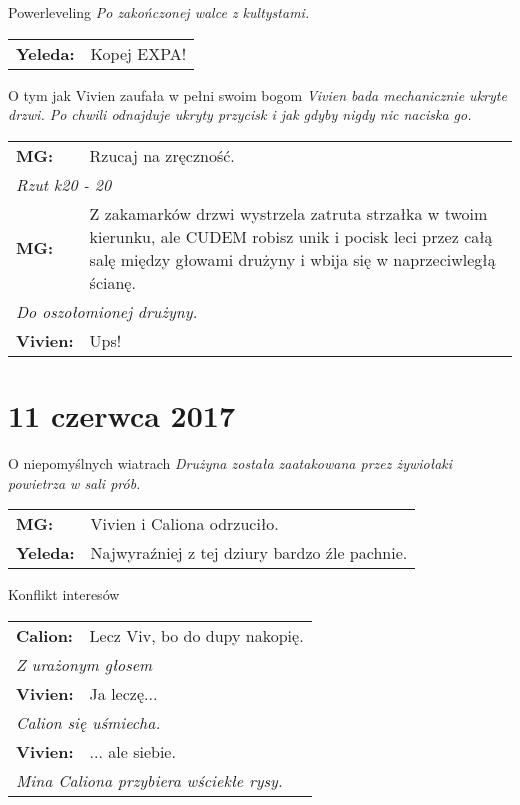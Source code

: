 \documentclass[10pt,twoside,twocolumn]{book}
\begin{document}
\begin{rpg-quotebox}{Powerleveling}
   \textit{Po zakończonej walce z kultystami.}\\
   
   \begin{tabularx}{\columnwidth}{lX}
      \textbf{Yeleda:} & Kopej EXPA!
   \end{tabularx}
\end{rpg-quotebox}


\begin{rpg-quotebox}{O tym jak Vivien zaufała w pełni swoim bogom}
   \textit{Vivien bada mechanicznie ukryte drzwi. Po chwili odnajduje ukryty przycisk i jak gdyby nigdy nic naciska go.}\\
   
   \begin{tabularx}{\columnwidth}{lX}
      \textbf{MG:} & Rzucaj na zręczność.\\
      \multicolumn{2}{l}{\textit{Rzut k20 - 20}}\\
      \textbf{MG:} & Z zakamarków drzwi wystrzela zatruta strzałka w twoim kierunku, ale CUDEM robisz unik i    pocisk leci przez całą salę między głowami drużyny i wbija się w naprzeciwległą ścianę.\\
      \multicolumn{2}{l}{\textit{Do oszołomionej drużyny.}}\\
      \textbf{Vivien:} & Ups!\\
   \end{tabularx}
\end{rpg-quotebox}

\section*{11 czerwca 2017}



\begin{rpg-quotebox}{O niepomyślnych wiatrach}
   \textit{Drużyna została zaatakowana przez żywiołaki powietrza w sali prób.}\\\newline
   \begin{tabularx}{\columnwidth}{lX}
      \textbf{MG:} & Vivien i Caliona odrzuciło.\\
      \textbf{Yeleda:} & Najwyraźniej z tej dziury bardzo źle pachnie.
   \end{tabularx}
\end{rpg-quotebox}


\begin{rpg-quotebox}{Konflikt interesów}
   \begin{tabularx}{\columnwidth}{lX}
      \textbf{Calion:} & Lecz Viv, bo do dupy nakopię.\\
      \multicolumn{2}{X}{\textit{Z urażonym głosem}}\\
      \textbf{Vivien:} & Ja leczę...\\
      \multicolumn{2}{X}{\textit{Calion się uśmiecha.}}\\
      \textbf{Vivien:} & ... ale siebie.\\
      \multicolumn{2}{X}{\textit{Mina Caliona przybiera wściekłe rysy.}}
   \end{tabularx}
\end{rpg-quotebox}
\end{document}
